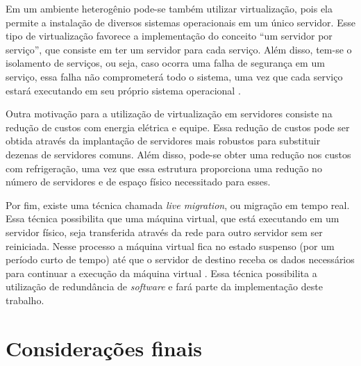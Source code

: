 
Em um ambiente heterogênio pode-se também utilizar virtualização, pois ela permite a instalação de diversos sistemas operacionais em um 
único servidor. Esse tipo de virtualização favorece a implementação do conceito ``um servidor por serviço'', que consiste em ter um servidor 
para cada serviço. Além disso, tem-se o isolamento de serviços, ou seja, caso ocorra uma falha de segurança em um serviço, essa falha não 
comprometerá todo o sistema, uma vez que cada serviço estará executando em seu próprio sistema operacional \cite{carissimi2008}.

Outra motivação para a utilização de virtualização em servidores consiste na redução de custos com energia elétrica e equipe. 
Essa redução de custos pode ser obtida através da implantação de servidores mais robustos para substituir dezenas de servidores comuns. 
Além disso, pode-se obter uma redução nos custos com refrigeração, uma vez que essa estrutura proporciona uma redução no número de servidores
e de espaço físico necessitado para esses.

Por fim, existe uma técnica chamada \textit{live migration}, ou migração em tempo real. Essa técnica possibilita que uma máquina virtual, 
que está executando em um servidor físico, seja transferida através da rede para outro servidor sem ser reiniciada. Nesse processo a máquina 
virtual fica no estado suspenso (por um período curto de tempo) até que o servidor de destino receba os dados necessários para continuar 
a execução da máquina virtual \cite{silva2009}. Essa técnica possibilita a utilização de redundância de \textit{software} e fará parte da 
implementação deste trabalho.

\section{Considerações finais}


